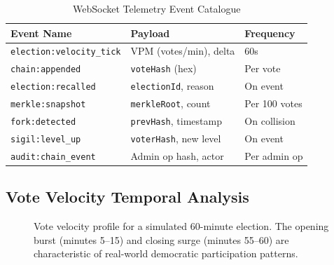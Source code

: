 \documentclass[journal,10pt,twocolumn]{IEEEtran}
\begin{document}
\begin{table}[htbp]
\caption{WebSocket Telemetry Event Catalogue}
\label{tab:websocket_events}
\centering
\small
{}
\begin{tabularx}{\linewidth}{@{}lXl@{}}
\toprule
\textbf{Event Name} & \textbf{Payload} & \textbf{Frequency} \\
\midrule
\texttt{election:velocity\_tick} & VPM (votes/min), delta & 60s \\
\texttt{chain:appended} & \texttt{voteHash} (hex) & Per vote \\
\texttt{election:recalled} & \texttt{electionId}, reason & On event \\
\texttt{merkle:snapshot} & \texttt{merkleRoot}, count & Per 100 votes \\
\texttt{fork:detected} & \texttt{prevHash}, timestamp & On collision \\
\texttt{sigil:level\_up} & \texttt{voterHash}, new level & On event \\
\texttt{audit:chain\_event} & Admin op hash, actor & Per admin op \\
\bottomrule
\end{tabularx}
\end{table}

\subsection{Vote Velocity Temporal Analysis}

\begin{figure}[htbp]
\centering
{}
\caption{Vote velocity profile for a simulated 60-minute election. The opening burst (minutes 5--15) and closing surge (minutes 55--60) are characteristic of real-world democratic participation patterns.}
\label{fig:velocity}
\end{figure}
\end{document}
